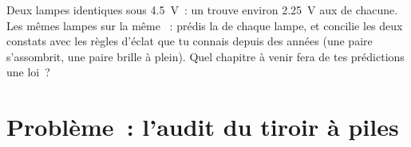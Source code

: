 \begin{exercise}[$\star\star\star$]\label{exo:g8:voltage-voltmeter:12}
Deux lampes identiques  sous \qty{4.5}{V}~: un 
trouve environ \qty{2.25}{V} aux  de chacune. Les mêmes lampes
 sur la même ~: prédis la  de chaque lampe,
et concilie les deux constats avec les règles d'éclat que tu connais
depuis des années (une paire  s'assombrit, une paire  brille à plein). Quel chapitre à venir fera de tes
prédictions une loi~?
\end{exercise}

\section{Problème~: l'audit du tiroir à piles}

